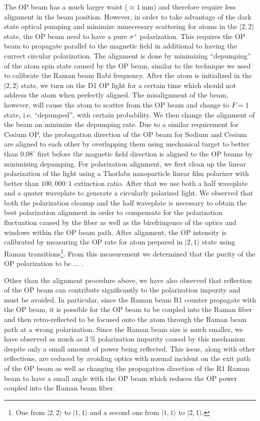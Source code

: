 The OP beam has a much larger waist ($\approx1~\mathrm{mm}$)
and therefore require less alignment in the beam position.
However, in order to take advantage of the dark state optical pumping and
minimize unnecessary scattering for atoms in the $|2,2\rangle$ state,
the OP beam need to have a pure $\sigma^+$ polarization.
This requires the OP beam to propagate parallel to the magnetic field
in additional to having the currect circular polarization.
The alignment is done by minimizing ``depumping'' of the atom spin state caused by the OP beam,
similar to the technique we used to calibrate the Raman beam Rabi frequency.
After the atom is initialized in the $|2,2\rangle$ state, we turn on the D1 OP light
for a certain time which should not address the atom when perfectly aligned.
The misalignment of the beam, however, will cause the atom to scatter from the OP beam
and change to $F=1$ state, i.e. ``depumped'', with certain probability.
We then change the alignment of the beam an minimize the depumping rate.
Due to a similar requirement for Cesium OP, the probagation direction of
the OP beam for Sodium and Cesium are aligned to each other by overlapping them
using mechanical target to better than $0.08^\circ$ first
before the magnetic field direction is aligned to the OP beams by minimizing depumping.
For polarization alignment, we first clean up the linear polarization of the light
using a Thorlabs nanoparticle linear film polarizer with better than $100,000:1$
extinction ratio. After that we use both a half waveplate and a quater waveplate
to generate a circularly polarized light.
We observed that both the polarization cleanup and the half waveplate is necessary
to obtain the best polarization alignment in order to compensate for the polarization
fluctuation caused by the fiber as well as the birefringence of the optics and windows
within the OP beam path. After alignment, the OP intensity is calibrated
by measuring the OP rate for atom prepared in $|2,1\rangle$ state
using Raman transitions\footnote{One from $|2,2\rangle$ to $|1,1\rangle$
  and a second one from $|1,1\rangle$ to $|2,1\rangle$.}.
From this measurement we determined that the purity of the OP polarization
to be ... .

Other than the alignment procedure above, we have also observed that reflection
of the OP beam can contribute significantly to the polarization impurity and
must be avoided. In particular, since the Raman beam R1 counter propagate with the OP beam,
it is possible for the OP beam to be coupled into the Raman fiber and then retro-reflected
to be focused onto the atom through the Raman beam path at a wrong polarization.
Since the Raman beam size is much smaller, we have observed as much as $3~\%$
polarization impurity caused by this mechanism despite only a small amount of
power being reflected. This issue, along with other reflections,
are reduced by avoiding optics with normal incident on the exit path of the OP beam
as well as changing the propagation direction of the R1 Raman beam
to have a small angle with the OP beam which reduces the OP power coupled into
the Raman beam fiber.

